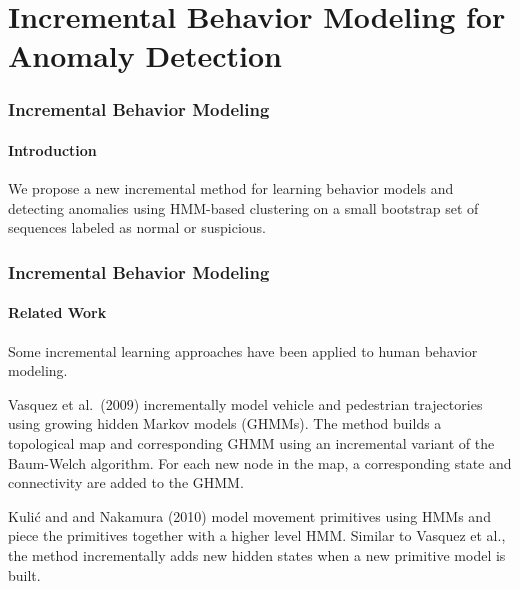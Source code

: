 
\section{Incremental Behavior Modeling for Anomaly Detection}

\ifnum{}

\begin{frame}
    \frametitle{Incremental Behavior Modeling}
    \framesubtitle{Introduction}

    We propose a new \alert{incremental} method for learning behavior 
    models and detecting anomalies using HMM-based clustering on 
    a small bootstrap set of sequences labeled as normal or suspicious.
  
\end{frame}


\begin{frame}
    \frametitle{Incremental Behavior Modeling}
    \framesubtitle{Related Work}

    Some incremental learning approaches have been applied to 
    human behavior modeling. 

    \bigskip

    Vasquez et al.\ (2009) incrementally model vehicle and 
    pedestrian trajectories using growing hidden Markov models 
    (GHMMs). The method builds a topological map and corresponding 
    GHMM using an incremental variant of the Baum-Welch algorithm. 
    For each new node in the map, a corresponding state and 
    connectivity are added to the GHMM. 

    \bigskip 

    Kuli{\'c} and and Nakamura (2010) model movement primitives
    using HMMs and piece the primitives together with a higher 
    level HMM. Similar to Vasquez et al., the method incrementally 
    adds new hidden states when a new primitive model is built.

\end{frame}


